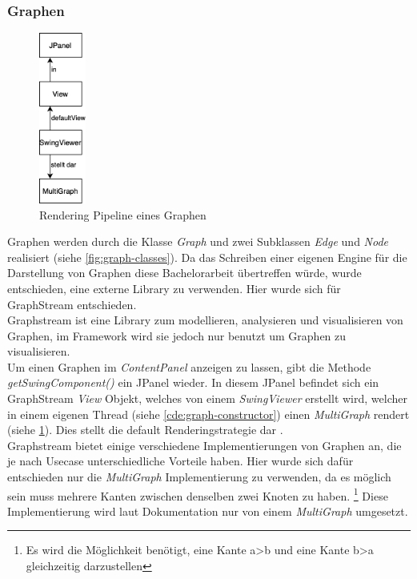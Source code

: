 \subsubsection{Graphen}
\begin{figure}
  \vspace{-10pt}
  \centering
  \includegraphics[width=0.1375\textwidth]{fig/GUI_Graph_rendering_pipeline.png}
  \caption{Rendering Pipeline eines Graphen}%
  \label{fig:graph-rendering-pipeline}
  \vspace{-10pt}
\end{figure}
Graphen werden durch die Klasse \textit{Graph} und zwei Subklassen 
\textit{Edge} und \textit{Node} realisiert (siehe \cref{fig:graph-classes}).
Da das Schreiben einer eigenen Engine für die Darstellung von Graphen
diese Bachelorarbeit übertreffen würde, wurde entschieden, eine externe Library
zu verwenden. Hier wurde sich für GraphStream \cite{GS}
entschieden.\\

Graphstream ist eine Library zum modellieren, analysieren und visualisieren von Graphen,
im Framework wird sie jedoch nur benutzt um Graphen zu visualisieren.\\
Um einen Graphen im \textit{ContentPanel} anzeigen zu lassen, gibt 
die Methode \textit{getSwingComponent()} ein JPanel wieder. 
In diesem JPanel befindet sich ein GraphStream \textit{View} Objekt, welches von einem
\textit{SwingViewer} erstellt wird, welcher in einem eigenen Thread (siehe \cref{cde:graph-constructor}) einen
\textit{MultiGraph} rendert (siehe \cref{fig:graph-rendering-pipeline}).
Dies stellt die default Renderingstrategie dar \cite{GS_render}.\\
Graphstream bietet einige verschiedene Implementierungen von Graphen an, 
die je nach Usecase unterschiedliche Vorteile haben. Hier wurde sich dafür
entschieden nur die \textit{MultiGraph} Implementierung zu verwenden, da es
möglich sein muss mehrere Kanten zwischen denselben zwei Knoten zu haben.
\footnote{Es wird die Möglichkeit benötigt, eine Kante a>b und eine Kante b>a gleichzeitig darzustellen}
Diese Implementierung wird laut Dokumentation nur von einem \textit{MultiGraph}
umgesetzt.\cite{GS_graphs}\\

